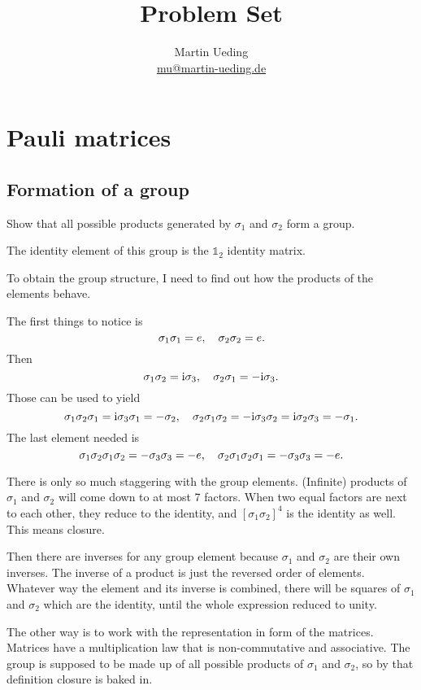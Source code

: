 \documentclass[11pt, english, fleqn, DIV=15, headinclude, BCOR=1cm]{scrartcl}
\title{Problem Set \arabic{problemset}}
\author{
    Martin Ueding \\ \small{\href{mailto:mu@martin-ueding.de}{mu@martin-ueding.de}}
}
\begin{document}
\maketitle

\section{Pauli matrices}

\newcommand\1{\sigma_1}
\newcommand\2{\sigma_2}
\newcommand\3{\sigma_3}
\newcommand\ssep{,\;}

\subsection{Formation of a group}

\begin{problem}
    Show that all possible products generated by $\1$ and $\2$ form a group.
\end{problem}

The identity element of this group is the $\mathbb 1_2$ identity matrix.

To obtain the group structure, I need to find out how the products of the
elements behave.

The first things to notice is
\[
    \1\1 = e
    \eqnsep
    \2\2 = e.
\]
Then
\[
    \1\2 = \iup \3
    \eqnsep
    \2\1 = - \iup \3.
\]
Those can be used to yield
\[
    \1\2\1 = \iup \3 \1 = - \2
    \eqnsep
    \2\1\2 = - \iup \3 \2 = \iup \2\3 = - \1.
\]
The last element needed is
\[
    \1\2\1\2 = - \3\3 = - e
    \eqnsep
    \2\1\2\1 = - \3\3 = - e.
\]

There is only so much staggering with the group elements. (Infinite) products
of $\1$ and $\2$ will come down to at most 7 factors. When two equal factors
are next to each other, they reduce to the identity, and $[\1\2]^4$ is the
identity as well. This means closure.

Then there are inverses for any group element because $\1$ and $\2$ are their
own inverses. The inverse of a product is just the reversed order of elements.
Whatever way the element and its inverse is combined, there will be squares of
$\1$ and $\2$ which are the identity, until the whole expression reduced to
unity.

The other way is to work with the representation in form of the matrices.
Matrices have a multiplication law that is non-commutative and associative. The
group is supposed to be made up of all possible products of $\1$ and $\2$, so
by that definition closure is baked in.
\end{document}
